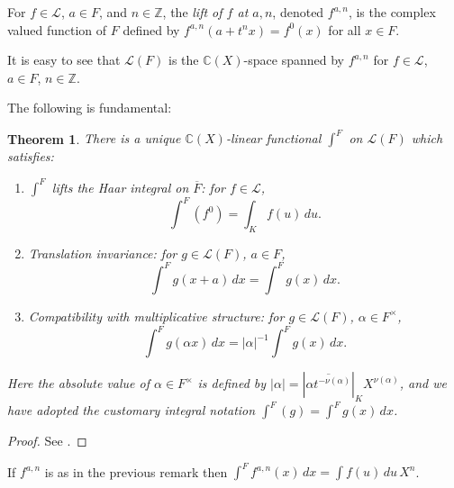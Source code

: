 \documentclass{lmsMODIFIED}
\newtheorem{theorem}{Theorem}[section] %
\newcommand{\bb}[1]{\mathbb{#1}}
\newcommand{\abs}[1]{\vert#1\vert}
\renewcommand{\cal}[1]{\mathcal{#1}}
\newcommand{\res}[1]{\overline{#1}}
\newcommand{\al}{\alpha}
\newcommand{\mult}[1]{#1^{\times}}
\begin{document}
\begin{remark}
For $f\in\cal{L}$, $a\in F$, and $n\in\bb{Z}$, the \emph{lift of $f$ at $a,n$}, denoted $f^{a,n}$, is the complex valued function of $F$ defined by $f^{a,n}(a+t^nx)=f^0(x)$ for all $x\in F$.

It is easy to see that $\cal{L}(F)$ is the $\bb{C}(X)$-space spanned by $f^{a,n}$ for $f\in\cal{L}$, $a\in F$, $n\in\bb{Z}$.
\end{remark}

The following is fundamental:
\begin{theorem}\label{theorem_main_properties_of_integral}
There is a unique $\bb{C}(X)$-linear functional $\int^F$ on $\cal{L}(F)$ which satisfies:
\begin{enumerate}
\item $\int^F$ lifts the Haar integral on $\res{F}$: for $f\in\cal{L}$, \[\int^F(f^0)=\int_K f(u)\,du.\]
\item Translation invariance: for $g\in\cal{L}(F)$, $a\in F$, \[\int^F g(x+a)\,dx=\int^F g(x)\,dx.\]
\item Compatibility with multiplicative structure: for $g\in\cal{L}(F)$, $\al\in\mult{F}$, \[\int^F g(\al x)\,dx=\abs{\al}^{-1}\int^F g(x)\,dx.\]
\end{enumerate}
Here the \emph{absolute value} of $\al\in\mult{F}$ is defined by $\abs{\al}=\left|\res{\al t^{-\nu(\al)}}\right|_KX^{\nu(\al)}$, and we have adopted the customary integral notation $\int^F(g)=\int^F g(x)\,dx$.
\end{theorem}
\begin{proof}
See \cite{Morrow2008}.
\end{proof}

\begin{remark}\label{remark_integral_of_lifted_function}
If $f^{a,n}$ is as in the previous remark then $\int^F f^{a,n}(x)\,dx=\int f(u)\,du\,X^n$.
\end{remark}
\end{document}
